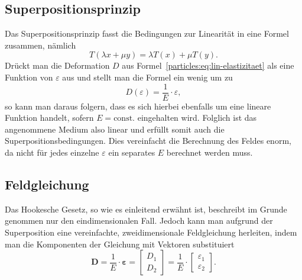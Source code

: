 \subsection{Superpositionsprinzip}
Das Superpositionsprinzip fasst die Bedingungen zur Linearität in eine Formel zusammen, nämlich
\[
    T(\lambda x + \mu y)
    = 
    \lambda T(x) 
    + 
    \mu T(y).
\]
Drückt man die Deformation $D$ aus Formel~\ref{particles:eq:lin-elastizitaet} als eine Funktion von $\varepsilon$ aus
und stellt man die Formel ein wenig um zu 
\[
    D(\varepsilon)
    = 
    \frac{1}{E} 
    \cdot 
    \varepsilon,
\]
so kann man daraus folgern, dass es sich hierbei ebenfalls um eine lineare Funktion handelt, 
sofern $E = \text{const.}$ eingehalten wird. %
Folglich ist das angenommene Medium also linear und erfüllt somit auch die Superpositionsbedingungen.
Dies vereinfacht die Berechnung des Feldes enorm, 
da nicht für jedes einzelne $\varepsilon$ ein separates $E$ berechnet werden muss. 


\subsection{Feldgleichung}
Das Hookesche Gesetz, so wie es einleitend erwähnt ist, 
beschreibt im Grunde genommen nur den eindimensionalen Fall. 
Jedoch kann man aufgrund der Superposition eine vereinfachte,
zweidimensionale Feldgleichung herleiten, 
indem man die Komponenten der Gleichung mit Vektoren substituiert %
\[
    \mathbf{D} 
    =   
    \frac{1}{E}
    \cdot
    \bm{\varepsilon}
    =   
    \begin{bmatrix}
        D_1\\
        D_2
    \end{bmatrix}
    =   
    \frac{1}{E}
    \cdot 
    \begin{bmatrix}
        \varepsilon_1\\
        \varepsilon_2
    \end{bmatrix}.
\]



